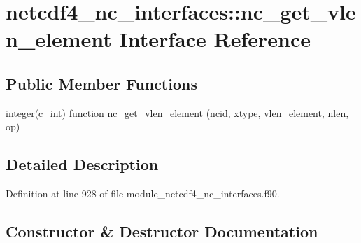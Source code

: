 \hypertarget{interfacenetcdf4__nc__interfaces_1_1nc__get__vlen__element}{}\section{netcdf4\+\_\+nc\+\_\+interfaces\+:\+:nc\+\_\+get\+\_\+vlen\+\_\+element Interface Reference}
\label{interfacenetcdf4__nc__interfaces_1_1nc__get__vlen__element}
\subsection*{Public Member Functions}
\begin{DoxyCompactItemize}
\item 
integer(c\+\_\+int) function \hyperlink{interfacenetcdf4__nc__interfaces_1_1nc__get__vlen__element_af9fc15cd5ff20163a2e05f9d6f445088}{nc\+\_\+get\+\_\+vlen\+\_\+element} (ncid, xtype, vlen\+\_\+element, nlen, op)
\end{DoxyCompactItemize}


\subsection{Detailed Description}


Definition at line 928 of file module\+\_\+netcdf4\+\_\+nc\+\_\+interfaces.\+f90.



\subsection{Constructor \& Destructor Documentation}
\mbox{\label{interfacenetcdf4__nc__interfaces_1_1nc__get__vlen__element_af9fc15cd5ff20163a2e05f9d6f445088}} 
